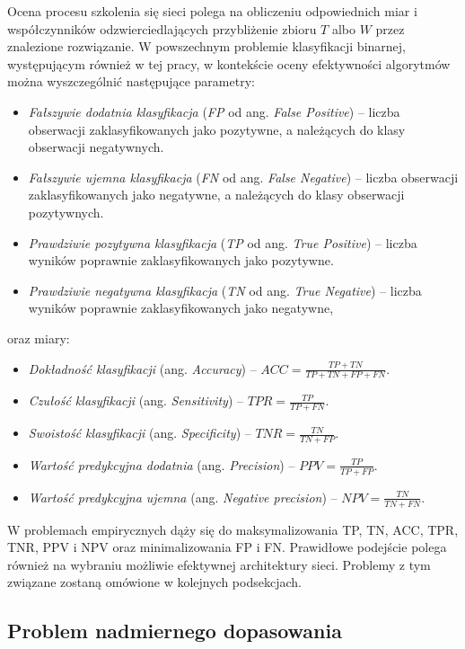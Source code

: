 Ocena procesu szkolenia się sieci polega na obliczeniu odpowiednich miar i współczynników odzwierciedlających przybliżenie zbioru $T$ albo $W$ przez znalezione rozwiązanie. W powszechnym problemie klasyfikacji binarnej, występującym również w tej pracy, w kontekście oceny efektywności algorytmów można wyszczególnić następujące parametry:
\begin{itemize}
	\item \textit{Fałszywie dodatnia klasyfikacja} (\textit{FP} od ang. \textit{False Positive}) -- liczba obserwacji zaklasyfikowanych jako pozytywne, a należących do klasy obserwacji negatywnych.
	\item \textit{Fałszywie ujemna klasyfikacja} (\textit{FN} od ang. \textit{False Negative}) -- liczba obserwacji zaklasyfikowanych jako negatywne, a należących do klasy obserwacji pozytywnych. 
	\item \textit{Prawdziwie pozytywna klasyfikacja} (\textit{TP} od ang. \textit{True Positive}) -- liczba wyników poprawnie zaklasyfikowanych jako pozytywne. 
	\item \textit{Prawdziwie negatywna klasyfikacja} (\textit{TN} od ang. \textit{True Negative}) -- liczba wyników poprawnie zaklasyfikowanych jako negatywne,
\end{itemize}
oraz miary:
\begin{itemize}
	\item \textit{Dokładność klasyfikacji} (ang. \textit{Accuracy}) -- $ACC = \frac{TP + TN}{TP+TN+FP+FN}$.
	\item \textit{Czułość klasyfikacji} (ang. \textit{Sensitivity}) -- $TPR = \frac{TP}{TP + FN}$.
	\item \textit{Swoistość klasyfikacji} (ang. \textit{Specificity}) -- $TNR = \frac{TN}{TN + FP}$.
	\item \textit{Wartość predykcyjna dodatnia} (ang. \textit{Precision}) -- $PPV = \frac{TP}{TP + FP}$.
	\item \textit{Wartość predykcyjna ujemna} (ang. \textit{Negative precision}) -- $NPV = \frac{TN}{TN + FN}$.
\end{itemize}

W problemach empirycznych dąży się do maksymalizowania TP, TN, ACC, TPR, TNR, PPV i NPV oraz minimalizowania FP i FN. Prawidłowe podejście polega również na wybraniu możliwie efektywnej architektury sieci. Problemy z tym związane zostaną omówione w kolejnych podsekcjach.

\subsection{Problem nadmiernego dopasowania}
\label{sec-overffiting}


